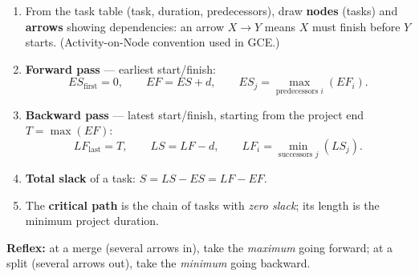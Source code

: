 \documentclass[11pt]{article}
\begin{document}
\begin{methode}
\begin{enumerate}
\item From the task table (task, duration, predecessors), draw \textbf{nodes} (tasks) and \textbf{arrows} showing dependencies: an arrow $X \to Y$ means $X$ must finish before $Y$ starts. (Activity-on-Node convention used in GCE.)
\item \textbf{Forward pass} — earliest start/finish:
\[ ES_{\text{first}} = 0, \qquad EF = ES + d, \qquad ES_j = \max_{\text{predecessors } i}(EF_i). \]
\item \textbf{Backward pass} — latest start/finish, starting from the project end $T = \max(EF)$:
\[ LF_{\text{last}} = T, \qquad LS = LF - d, \qquad LF_i = \min_{\text{successors } j}(LS_j). \]
\item \textbf{Total slack} of a task: $S = LS - ES = LF - EF$.
\item The \textbf{critical path} is the chain of tasks with \emph{zero slack}; its length is the minimum project duration.
\end{enumerate}
\textbf{Reflex:} at a merge (several arrows in), take the \emph{maximum} going forward; at a split (several arrows out), take the \emph{minimum} going backward.
\end{methode}
\end{document}
